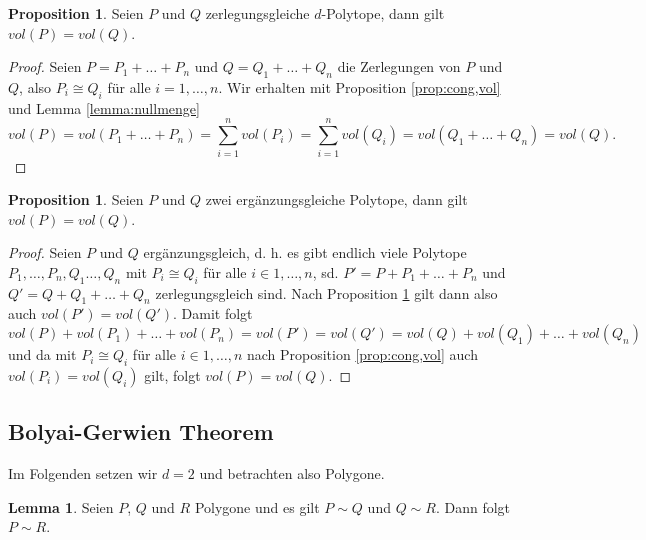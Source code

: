 \documentclass[11pt,titlepage]{article}
\theoremstyle{definition}
\newtheorem{proposition}[theorem]{Proposition}
\newtheorem{lemma}[theorem]{Lemma}
\theoremstyle{remark}
\begin{document}
	\begin{proposition} \label{prop:zerl,vol}
		Seien $P$ und $Q$ zerlegungsgleiche $d$-Polytope, dann gilt $vol(P)=vol(Q)$.
	\end{proposition}
	
	\begin{proof}
		Seien $P=P_1+\ldots+P_n$ und $Q=Q_1+\ldots+Q_n$ die Zerlegungen von $P$ und 
		$Q$, also $P_i\cong Q_i$ für alle $i=1,\ldots,n$. Wir erhalten mit Proposition \ref{prop:cong,vol} und Lemma \ref{lemma:nullmenge} 
		\[vol(P)=vol(P_1+\ldots+P_n)=\sum_{i=1}^n vol(P_i)=\sum_{i=1}^n vol(Q_i)=vol(Q_1+\ldots+Q_n)=vol(Q).\]
	\end{proof}

	\begin{proposition}
		Seien $P$ und $Q$ zwei ergänzungsgleiche Polytope, dann gilt $vol(P)=vol(Q)$.
	\end{proposition}
	
	\begin{proof}
		Seien $P$ und $Q$ ergänzungsgleich, d. h. es gibt endlich viele Polytope $P_1,\ldots,P_n,
		Q_1\ldots,Q_n$ mit $P_i\cong Q_i$ für alle $i\in{1,\ldots,n}$, sd. 
		$P'=P+P_1+\ldots+P_n$ und $Q'=Q+Q_1+\ldots+Q_n$ zerlegungsgleich sind. Nach 
		Proposition \ref{prop:zerl,vol} gilt dann also auch $vol(P')=vol(Q')$. Damit folgt
		\[vol(P)+vol(P_1)+\ldots+vol(P_n)=vol(P')=vol(Q')=vol(Q)+vol(Q_1)+\ldots+vol(Q_n)\]
		und da mit $P_i\cong Q_i$ für alle $i\in{1,\ldots,n}$ nach Proposition \ref{prop:cong,vol} 
		auch $vol(P_i)=vol(Q_i)$ gilt, folgt $vol(P)=vol(Q)$.
	\end{proof}
	
	\subsection{Bolyai-Gerwien Theorem}
	
	Im Folgenden setzen wir $d=2$ und betrachten also Polygone.
	
	\begin{lemma} \label{lemma:transitiv}
		Seien $P$, $Q$ und $R$ Polygone und es gilt $P\sim Q$ und $Q\sim R$. Dann folgt $P\sim R$.
	\end{lemma}
	
\end{document}
